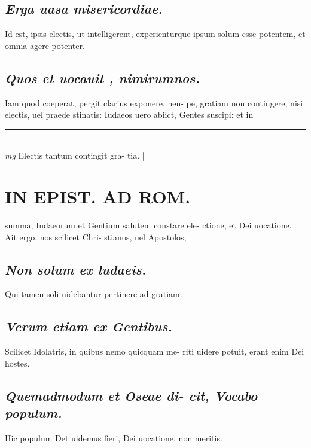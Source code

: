 \documentclass{article}
\begin{document}
\begin{pages}
\subsection*{\textit{Erga uasa misericordiae. }}\pstart Id est, ipsis electis, ut intelligerent, experienturque  ipsum solum esse potentem, et omnia agere potenter.   \pend
{}
{}
\subsection*{\textit{Quos et uocauit , nimirumnos. }}\pstart Iam quod coeperat, pergit clarius exponere, nen- pe, gratiam non contingere, nisi electis, uel praede stinatis: Iudaeos uero abiict, Gentes suscipi: et in  \pend
\vspace{0.5cm}\noindent
\vspace{0.2cm}\rule{1cm}{0.2pt}\\ 
\hspace{0.2cm}\textit{mg}
\footnotesize Electis tantum contingit gra- tia.  
\normalsize| 
\section*{IN EPIST. AD ROM.  }
\marginpar{[ p.114 ]}\pstart summa, Iudaeorum et Gentium salutem constare ele- ctione, et Dei uocatione. Ait ergo, nos scilicet Chri- stianos, uel Apostolos,  \pend
{}
{}
\subsection*{\textit{Non solum ex ludaeis. }}\pstart Qui tamen soli uidebantur pertinere ad gratiam.  \pend
{}
{}
\subsection*{\textit{Verum etiam ex Gentibus. }}\pstart Scilicet Idolatris, in quibus nemo quicquam me- riti uidere potuit, erant enim Dei hostes.   \pend
{}
{}
\subsection*{\textit{Quemadmodum et Oseae di- cit, Vocabo populum. }}\pstart Hic populum Det uidemus fieri, Dei uocatione, non meritis.  \pend
{}
{}

\end{pages}
\end{document}
